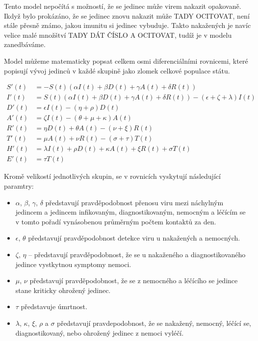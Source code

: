 \documentclass[a4paper,11pt]{article}
\begin{document}
		Tento model nepočítá s možností, že se jedinec může virem nakazit opakovaně. Ikdyž bylo prokázáno, že se jedinec znovu nakazit může TADY OCITOVAT, není stále přesně známo, jakou imunitu si jedinec vybuduje. Takto nakažených je navíc velice malé množštví TADY DÁT ČÍSLO A OCITOVAT, tudíž je v modelu zanedbáváme.
		
		Model můžeme matematicky popsat celkem osmi diferenciálními rovnicemi, které popisují vývoj jedinců v každé skupině jako zlomek celkové populace státu.
		
		\begin{align}
			S'(t) &= - S(t) (\alpha I(t) + \beta D(t) + \gamma A(t) + \delta R(t))\\
			I'(t) &= S(t) (\alpha I(t) + \beta D(t) + \gamma A(t) + \delta R(t)) - (\epsilon + \zeta + \lambda)I(t)\\
			D'(t) &= \epsilon I(t) - (\eta + \rho) D(t)\\
			A'(t) &= \zeta I(t) - (\theta + \mu + \kappa) A(t)\\
			R'(t) &= \eta D(t) + \theta A(t) - (\nu + \xi) R(t)\\
			T'(t) &= \mu A(t) + \nu R(t) - (\sigma + \tau) T(t)\\
			H'(t) &= \lambda I(t) + \rho D(t) + \kappa A(t) + \xi R(t) + \sigma T(t)\\
			E'(t) &= \tau T(t)
		\end{align}
	
	Kromě velikostí jednotlivých skupin, se v rovnicích vyskytují následující paramtry:
	\begin{itemize}
		\item $\alpha$, $\beta$, $\gamma$, $\delta$ představují pravděpodobnost přenosu viru mezi náchylným jedincem a jedincem infikovaným, diagnostikovaným, nemocným a léčícím se v tomto pořadí vynásobenou průměrným počtem kontaktů za den.
		\item $\epsilon$, $\theta$ představují pravděpodobnost detekce viru u nakažených a nemocných.
		\item $\zeta$, $\eta$ -- představují pravděpodobnost, že se u nakaženého a diagnostikovaného jedince vystkytnou symptomy nemoci.
		\item $\mu$, $\nu$ představují pravděpodobnost, že se z nemocného a léčícího se jedince stane kriticky ohrožený jedinec.
		\item $\tau$ představuje úmrtnost.
		\item $\lambda$, $\kappa$, $\xi$, $\rho$ a $\sigma$ představují pravdepodobnost, že se nakažený, nemocný, léčící se, diagnostikovaný, nebo ohrožený jedinec z nemoci vyléčí.
	\end{itemize}
		
\end{document}
